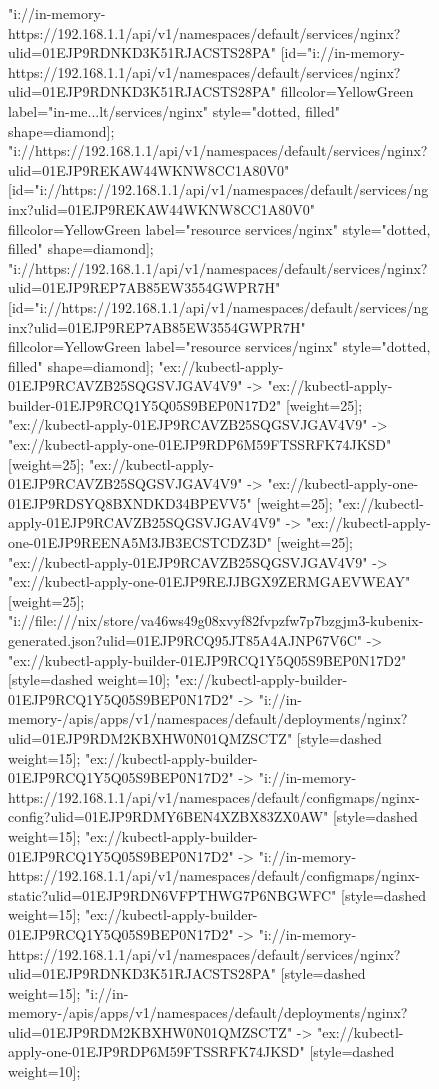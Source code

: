 \begin{figure}[p]
\begin{sideways}
{"i://in-memory-https://192.168.1.1/api/v1/namespaces/default/services/nginx?ulid=01EJP9RDNKD3K51RJACSTS28PA" [id="i://in-memory-https://192.168.1.1/api/v1/namespaces/default/services/nginx?ulid=01EJP9RDNKD3K51RJACSTS28PA" fillcolor=YellowGreen label="in-me...lt/services/nginx" style="dotted, filled" shape=diamond];
"i://https://192.168.1.1/api/v1/namespaces/default/services/nginx?ulid=01EJP9REKAW44WKNW8CC1A80V0" [id="i://https://192.168.1.1/api/v1/namespaces/default/services/nginx?ulid=01EJP9REKAW44WKNW8CC1A80V0" fillcolor=YellowGreen label="resource services/nginx" style="dotted, filled" shape=diamond];
"i://https://192.168.1.1/api/v1/namespaces/default/services/nginx?ulid=01EJP9REP7AB85EW3554GWPR7H" [id="i://https://192.168.1.1/api/v1/namespaces/default/services/nginx?ulid=01EJP9REP7AB85EW3554GWPR7H" fillcolor=YellowGreen label="resource services/nginx" style="dotted, filled" shape=diamond];
"ex://kubectl-apply-01EJP9RCAVZB25SQGSVJGAV4V9" -> "ex://kubectl-apply-builder-01EJP9RCQ1Y5Q05S9BEP0N17D2" [weight=25];
"ex://kubectl-apply-01EJP9RCAVZB25SQGSVJGAV4V9" -> "ex://kubectl-apply-one-01EJP9RDP6M59FTSSRFK74JKSD" [weight=25];
"ex://kubectl-apply-01EJP9RCAVZB25SQGSVJGAV4V9" -> "ex://kubectl-apply-one-01EJP9RDSYQ8BXNDKD34BPEVV5" [weight=25];
"ex://kubectl-apply-01EJP9RCAVZB25SQGSVJGAV4V9" -> "ex://kubectl-apply-one-01EJP9REENA5M3JB3ECSTCDZ3D" [weight=25];
"ex://kubectl-apply-01EJP9RCAVZB25SQGSVJGAV4V9" -> "ex://kubectl-apply-one-01EJP9REJJBGX9ZERMGAEVWEAY" [weight=25];
"i://file:///nix/store/va46ws49g08xvyf82fvpzfw7p7bzgjm3-kubenix-generated.json?ulid=01EJP9RCQ95JT85A4AJNP67V6C" -> "ex://kubectl-apply-builder-01EJP9RCQ1Y5Q05S9BEP0N17D2" [style=dashed weight=10];
"ex://kubectl-apply-builder-01EJP9RCQ1Y5Q05S9BEP0N17D2" -> "i://in-memory-/apis/apps/v1/namespaces/default/deployments/nginx?ulid=01EJP9RDM2KBXHW0N01QMZSCTZ" [style=dashed weight=15];
"ex://kubectl-apply-builder-01EJP9RCQ1Y5Q05S9BEP0N17D2" -> "i://in-memory-https://192.168.1.1/api/v1/namespaces/default/configmaps/nginx-config?ulid=01EJP9RDMY6BEN4XZBX83ZX0AW" [style=dashed weight=15];
"ex://kubectl-apply-builder-01EJP9RCQ1Y5Q05S9BEP0N17D2" -> "i://in-memory-https://192.168.1.1/api/v1/namespaces/default/configmaps/nginx-static?ulid=01EJP9RDN6VFPTHWG7P6NBGWFC" [style=dashed weight=15];
"ex://kubectl-apply-builder-01EJP9RCQ1Y5Q05S9BEP0N17D2" -> "i://in-memory-https://192.168.1.1/api/v1/namespaces/default/services/nginx?ulid=01EJP9RDNKD3K51RJACSTS28PA" [style=dashed weight=15];
"i://in-memory-/apis/apps/v1/namespaces/default/deployments/nginx?ulid=01EJP9RDM2KBXHW0N01QMZSCTZ" -> "ex://kubectl-apply-one-01EJP9RDP6M59FTSSRFK74JKSD" [style=dashed weight=10];
}
\end{sideways}
\end{figure}
